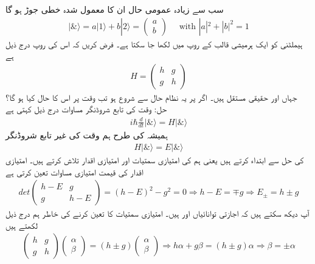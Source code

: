 سب سے زیادہ عمومی حال ان کا معمول شدہ خطی جوڑ ہو گا
\begin{align*}
| \& \rangle = a|1\rangle +b|2\rangle = \begin{pmatrix} a \\ b  \end{pmatrix} \quad \text{ with } |a|^{2} + |b|^{2} = 1
\end{align*}
ہیملٹنی کو ایک ہرمیشی قالب کے روپ میں لکھا جا سکتا ہے۔ فرض کریں کہ اس کی روپ درج ذیل ہے 
\begin{align*}
H = \begin{pmatrix} h & g \\ g & h  \end{pmatrix}
\end{align*}
جہاں اور  حقیقی مستقل ہیں۔ اگر  پر یہ نظام حال  سے شروع ہو تب وقت  پر اس کا حال کیا ہو گا؟ 
حل: وقت کی تابع شروڈنگر مساوات درج ذیل کہتی ہے 
\begin{align}
i \hbar \frac{d}{dt} | \& \rangle = H | \&  \rangle
\end{align}
ہمیشہ کی طرح ہم وقت کی غیر تابع شروڈنگر
\begin{align}
H | \& \rangle = E | \& \rangle 
\end{align}
 کی حل سے ابتداء کرتے ہیں یعنی ہم  کی امتیازی سمتیات اور امتیازی اقدار تلاش کرتے ہیں۔ امتیازی اقدار کی قیمت امتیازی مساوات تعین کرتی ہے 
\begin{align*}
det \begin{pmatrix} h-E & g \\ g & h-E \end{pmatrix} = (h-E)^{2} - g^{2} = 0 \Rightarrow h-E = \mp g \Rightarrow E_{\pm} = h \pm g
\end{align*}
آپ دیکھ سکتے ہیں کہ اجازتی  توانائیاں  اور  ہیں۔ امتیازی سمتیات کا تعین کرنے کی خاطر ہم درج ذیل لکھتے ہیں 
\begin{align*}
\begin{pmatrix} h & g \\ g & h  \end{pmatrix} \begin{pmatrix}
 \alpha \\ \beta \end{pmatrix} = (h\pm g) \begin{pmatrix} \alpha \\ \beta  \end{pmatrix} \Rightarrow h\alpha + g\beta = (h\pm g) \alpha \Rightarrow \beta = \pm \alpha
\end{align*}
